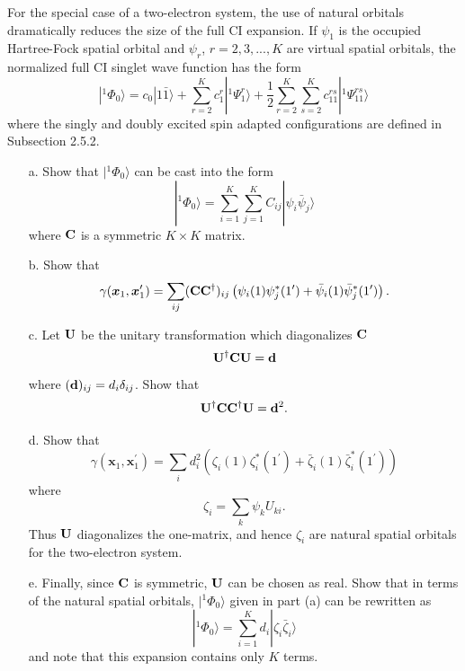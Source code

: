 \documentclass[a4paper]{book}
\newcounter{exercise}[chapter]
\newcommand{\C}{{\bf C}}
\newcommand{\U}{{\bf U}}
\begin{document}
	\begin{exercise}
	For the special case of a two-electron system, the use of natural orbitals dramatically reduces the size of the full CI expansion. If $\psi_1$ is the occupied Hartree-Fock spatial orbital and $\psi_r$, $r=2,3,...,K$ are virtual spatial orbitals, the normalized full CI singlet wave function has the form
	\[
		|{}^{1}\Phi_0 \rangle = c_0 |1\bar{1}\rangle + \sum_{r=2}^K c^r_1 | {}^{1} \Psi^r_1 \rangle + \frac{1}{2} \sum_{r=2}^K \sum_{s=2}^K c^{rs}_{11} | {}^{1} \Psi^{rs}_{11} \rangle
	\]
	where the singly and doubly excited spin adapted configurations are defined in Subsection 2.5.2.
	
	\begin{enumerate}
	
	\item[a.] Show that $|{}^{1}\Phi_0 \rangle$	can be cast into the form
	\[
		|{}^{1}\Phi_0 \rangle = \sum_{i=1}^K \sum_{j=1}^K C_{ij} | \psi_i \bar{\psi}_j \rangle
	\]
	where $\C$ is a symmetric $K \times K$ matrix.
	
	\item[b.] Show that
	\[
		\gamma( \boldsymbol{x}_1 , \boldsymbol{x}_1^\prime ) = \sum_{ij} (\C \C^\dagger)_{ij} \left( \psi_i(1) \psi^*_j(1^\prime) + \bar{\psi}_i (1) \bar{\psi}_j^* (1^\prime) \right).
	\]
	
	\item[c.] Let $\U$ be the unitary transformation which diagonalizes $\C$
	\[
		\U^\dagger \C \U = {\bf d}
	\]
	where $({\bf d})_{ij} = d_i \delta_{ij}$. Show that
	\[
		\U^\dagger \C \C^\dagger \U = {\bf d}^2.
	\]
	
	\item[d.] Show that
	\[
		\gamma( \boldsymbol{x}_1 , \boldsymbol{x}_1^\prime ) = \sum_i d^2_i \left( \zeta_i(1)\zeta^*_i(1^\prime) + \bar{\zeta}_i(1) \bar{\zeta}^*_i (1^\prime) \right)
	\]
	where
	\[
		\zeta_i = \sum_k \psi_k U_{ki}.
	\]
	Thus $\U$ diagonalizes the one-matrix, and hence $\zeta_i$ are natural spatial orbitals for the two-electron system.
	
	\item[e.] Finally, since $\C$ is symmetric, $\U$ can be chosen as real. Show that in terms of the natural spatial orbitals, $| {}^{1} \Phi_0 \rangle$ given in part (a) can be rewritten as
	\[
		| {}^{1} \Phi_0 \rangle = \sum_{i=1}^K d_i | \zeta_i \bar{\zeta}_i \rangle
	\]
	and note that this expansion contains only $K$ terms.
	\end{enumerate}
	\end{exercise}
	
\end{document}
